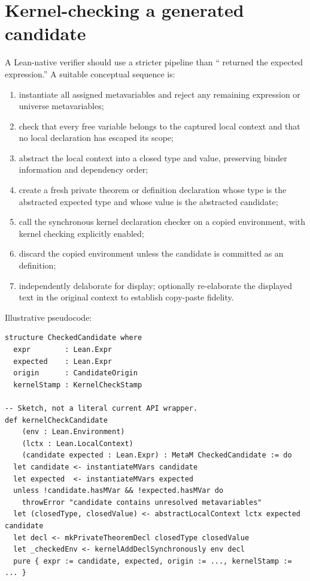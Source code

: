 \documentclass[10pt,letterpaper,oneside]{report}
\newcommand{\code}[1]{\texttt{\detokenize{#1}}}
\begin{document}
\section{Kernel-checking a generated candidate}

A Lean-native verifier should use a stricter pipeline than ``\code{Meta.inferType} returned the expected expression.'' A suitable conceptual sequence is:

\begin{enumerate}
  \item instantiate all assigned metavariables and reject any remaining expression or universe metavariables;
  \item check that every free variable belongs to the captured local context and that no local declaration has escaped its scope;
  \item abstract the local context into a closed type and value, preserving binder information and dependency order;
  \item create a fresh private theorem or definition declaration whose type is the abstracted expected type and whose value is the abstracted candidate;
  \item call the synchronous kernel declaration checker on a copied environment, with kernel checking explicitly enabled;
  \item discard the copied environment unless the candidate is committed as an \code{itN} definition;
  \item independently delaborate for display; optionally re-elaborate the displayed text in the original context to establish copy-paste fidelity.
\end{enumerate}

Illustrative pseudocode:

\begin{lstlisting}[language=Leanish]
structure CheckedCandidate where
  expr        : Lean.Expr
  expected    : Lean.Expr
  origin      : CandidateOrigin
  kernelStamp : KernelCheckStamp

-- Sketch, not a literal current API wrapper.
def kernelCheckCandidate
    (env : Lean.Environment)
    (lctx : Lean.LocalContext)
    (candidate expected : Lean.Expr) : MetaM CheckedCandidate := do
  let candidate <- instantiateMVars candidate
  let expected  <- instantiateMVars expected
  unless !candidate.hasMVar && !expected.hasMVar do
    throwError "candidate contains unresolved metavariables"
  let (closedType, closedValue) <- abstractLocalContext lctx expected candidate
  let decl <- mkPrivateTheoremDecl closedType closedValue
  let _checkedEnv <- kernelAddDeclSynchronously env decl
  pure { expr := candidate, expected, origin := ..., kernelStamp := ... }
\end{lstlisting}
\end{document}
